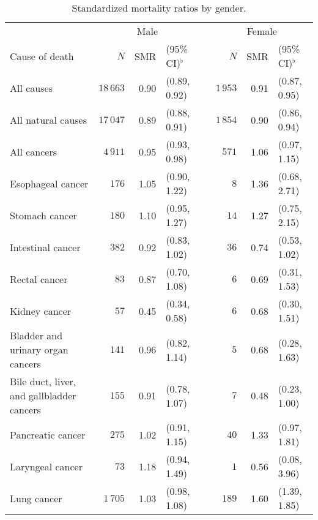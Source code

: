 \documentclass[]{article}
\begin{document}
\begin{table}[H]
\centering
\caption{Standardized mortality ratios by gender.} 
\begin{tabular}{lrrlcrrl}
  \hline & \multicolumn{3}{c}{Male} && \multicolumn{3}{c}{Female} \\ 
 \cline{2-4}\cline{6-8}
Cause of death & $N$ & SMR & (95\% CI)$^\flat$ &   & $N$ & SMR & (95\% CI)$^\flat$ \\ 
  \midrule
All causes & $18\,663$ & 0.90 &  (0.89, 0.92) &  & $1\,953$ & 0.91 &  (0.87, 0.95) \\ 
  All natural causes & $17\,047$ & 0.89 &  (0.88, 0.91) &  & $1\,854$ & 0.90 &  (0.86, 0.94) \\ 
  All cancers & $4\,911$ & 0.95 &  (0.93, 0.98) &  & $571$ & 1.06 &  (0.97, 1.15) \\ 
  \hspace{10pt}Esophageal cancer & $176$ & 1.05 &  (0.90, 1.22) &  & $8$ & 1.36 &  (0.68, 2.71) \\ 
  \hspace{10pt}Stomach cancer & $180$ & 1.10 &  (0.95, 1.27) &  & $14$ & 1.27 &  (0.75, 2.15) \\ 
  \hspace{10pt}Intestinal cancer & $382$ & 0.92 &  (0.83, 1.02) &  & $36$ & 0.74 &  (0.53, 1.02) \\ 
  \hspace{10pt}Rectal cancer & $83$ & 0.87 &  (0.70, 1.08) &  & $6$ & 0.69 &  (0.31, 1.53) \\ 
  \hspace{10pt}Kidney cancer & $57$ & 0.45 &  (0.34, 0.58) &  & $6$ & 0.68 &  (0.30, 1.51) \\ 
  \hspace{10pt}Bladder and urinary organ cancers & $141$ & 0.96 &  (0.82, 1.14) &  & $5$ & 0.68 &  (0.28, 1.63) \\ 
  \hspace{10pt}Bile duct, liver, and gallbladder cancers & $155$ & 0.91 &  (0.78, 1.07) &  & $7$ & 0.48 &  (0.23, 1.00) \\ 
  \hspace{10pt}Pancreatic cancer & $275$ & 1.02 &  (0.91, 1.15) &  & $40$ & 1.33 &  (0.97, 1.81) \\ 
  \hspace{10pt}Laryngeal cancer & $73$ & 1.18 &  (0.94, 1.49) &  & $1$ & 0.56 &  (0.08, 3.96) \\ 
  \hspace{10pt}Lung cancer & $1\,705$ & 1.03 &  (0.98, 1.08) &  & $189$ & 1.60 &  (1.39, 1.85) \\ 

\end{tabular}
\end{table}
\end{document}
